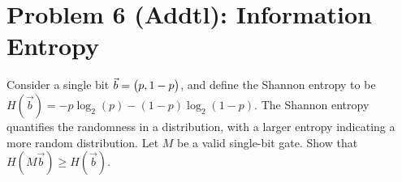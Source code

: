 \documentclass{article}
\begin{document}
\section*{Problem 6 (Addtl): Information Entropy}
Consider a single bit $\vec b = \mqty(p, 1-p)$, and define the Shannon entropy to be $H(\vec b) = -p\log_2(p) - (1-p)\log_2(1-p)$. The Shannon entropy quantifies the randomness in a distribution, with a larger entropy indicating a more random distribution. Let $M$ be a valid single-bit gate. Show that $H(M\vec b) \geq H(\vec b)$. 
\end{document}
